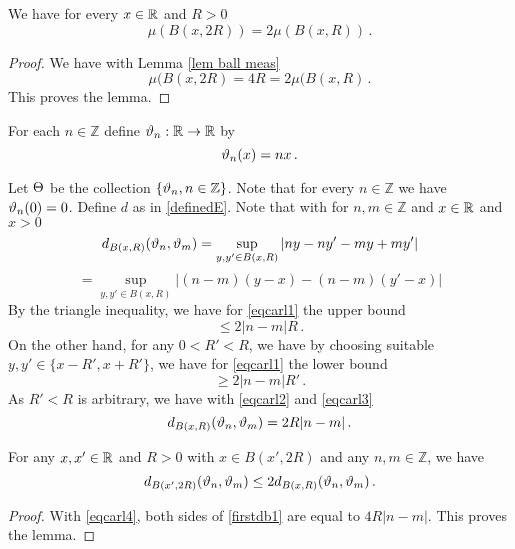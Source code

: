 {\begin{lemma}\label{lem r doubling}
    We have for every $x\in \mathbb{R}$ and $R>0$
    \begin{equation}
        \mu(B(x,2R))=2\mu(B(x,R))\, .
    \end{equation}
\end{lemma}
\begin{proof}
    We have with Lemma \ref{lem ball meas}
\begin{equation}
    \mu(B(x,2R)=4R=2\mu(B(x,R)\, .
\end{equation}
This proves the lemma.
\end{proof}

For each $n\in \mathbb{Z}$ define
$\vartheta_n:\mathbb{R}\to \mathbb{R}$ by
\begin{equation}
    \vartheta_n(x)=nx\, .
\end{equation}


Let $\Theta$ be the collection $\{\vartheta_n, n\in \mathbb{Z}\}$.
Note that for every $n\in \mathbb{Z}$ we have $\vartheta_n(0)=0$.
Define $d$ as in \eqref{definedE}. Note that
with for
$n,m\in \mathbb{Z}$ and $x\in \mathbb{R}$ and $x>0$
\begin{equation}
    d_{B(x,R)}(\vartheta_n,\vartheta_m)=\sup_{y,y'\in B(x,R)}|ny-ny'-my+my'|
\end{equation}
\begin{equation}\label{eqcarl1}
       =\sup_{y,y'\in B(x,R)}|(n-m)(y-x)-(n-m)(y'-x)|
 \end{equation}
By the triangle inequality, we have for \eqref{eqcarl1} the upper bound
\begin{equation}\label{eqcarl2}
       \le 2|n-m|R\, .
 \end{equation}
On the other hand, for any $0<R'<R$, we have
by choosing suitable $y,y'\in \{x-R', x+R'\}$,
we have for \eqref{eqcarl1} the lower bound
\begin{equation}\label{eqcarl3}
       \ge 2|n-m|R'\, .
 \end{equation}
As $R'<R$ is arbitrary, we have with \eqref{eqcarl2}
and \eqref{eqcarl3}
\begin{equation}\label{eqcarl4}
    d_{B(x,R)}(\vartheta_n,\vartheta_m)=2R|n-m|\, .
\end{equation}



\begin{lemma}\label{lem fdb1}
  For any $x,x'\in \mathbb{R}$ and $R>0$ with
   $x\in B(x',2R)$  and any $n,m\in \mathbb{Z}$, we have
\begin{equation}\label{firstdb1}
    d_{B(x',2R)}(\vartheta_n,\vartheta_m)\le 2 d_{B(x,R)}(\vartheta_n,\vartheta_m) \, .
\end{equation}
\end{lemma}
\begin{proof}
With \eqref{eqcarl4}, both sides of \eqref{firstdb1} are equal to $4R|n-m|$. This proves the lemma.
\end{proof}

}
